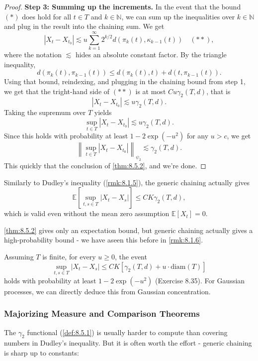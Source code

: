 \begin{proof}
\textbf{Step 3: Summing up the increments.} In the event that the bound $(*)$ does hold for all $t \in T$ and 
$k \in \mathbb{N}$, we can sum up the inequalities over $k \in \mathbb{N}$ and plug in the result into the 
chaining sum. We get 
\[ |X_t - X_{t_0}| \lesssim u \sum_{k = 1}^{\infty} 2^{k/2} d(\pi_k(t), \kappa_{k - 1}(t)) \quad (**), \]
where the notation $\lesssim$ hides an absolute constant factor. By the triangle inequality, 
\[ d(\pi_k(t), \pi_{k - 1}(t)) \leq d(\pi_k(t), t) + d(t, \pi_{k - 1}(t)). \]
Using that bound, reindexing, and plugging in the chaining bound from step 1, we get that the tright-hand side 
of $(**)$ is at most $Cu \gamma_2(T, d)$, that is 
\[ |X_t - X_{t_0}| \lesssim u \gamma_2(T, d). \]
Taking the supremum over $T$ yields 
\[ \sup_{t \in T}|X_t - X_{t_0}| \lesssim u \gamma_2(T, d). \]
Since this holds with probability at least $1 - 2 \exp{(-u^2)}$ for any $u > c$, we get 
\[ \left\lVert \sup_{t \in T}|X_t - X_{t_0}| \right\rVert_{\psi_2} \lesssim \gamma_2(T, d). \]
This quickly that the conclusion of \cref{thm:8.5.2}, and we're done.
\end{proof}

\begin{remark}
\label{rmk:8.5.3}
Similarly to Dudley's inequality (\cref{rmk:8.1.5}), the generic chaining actually gives 
\[ \mathbb{E}\left[ \sup_{t, s \in T}|X_t - X_s| \right] \leq CK \gamma_2(T, d), \]
which is valid even without the mean zero assumption $\mathbb{E}\left[ X_t \right] = 0$.
\end{remark}

\begin{remark}
\label{rmk:8.5.4}
\cref{thm:8.5.2} gives only an expectation bound, but generic chaining actually gives a high-probability bound - 
we have aseen this before in \cref{rmk:8.1.6}.

Assuming $T$ is finite, for every $u \geq 0$, the event 
\[ \sup_{t, s \in T}|X_t - X_s| \leq CK \left[ \gamma_2(T, d) + u \cdot \mathrm{diam}(T) \right] \]
holds with probability at least $1 - 2 \exp{(-u^2)}$ (Exercise 8.35). For Gaussian processes, we can directly 
deduce this from Gaussian concentration.
\end{remark}


\subsubsection{Majorizing Measure and Comparison Theorems}
The $\gamma_2$ functional (\cref{def:8.5.1}) is usually harder to compute than covering numbers in Dudley's 
inequality. But it is often worth the effort - generic chaining is sharp up to constants:

